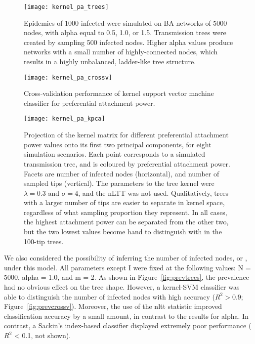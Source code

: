 \begin{figure}[ht]
  \centering
  \label{fig:patrees}
  \texttt{[image: kernel\_pa\_trees]}
  \caption[Visibly distinctive trees simulated under three values of \gls{alpha}]{
    Epidemics of 1000 infected were simulated on \gls{BA} networks of 5000
    nodes, with \gls{alpha} equal to 0.5, 1.0, or 1.5. Transmission trees were
    created by sampling 500 infected nodes. Higher \gls{alpha} values produce
    networks with a small number of highly-connected nodes, which results in a
    highly unbalanced, ladder-like tree structure.
  }
\end{figure}

\begin{figure}[ht]
  \centering
  \label{fig:pacrossv}
  \texttt{[image: kernel\_pa\_crossv]}
  \caption[Cross-validation performance of kernel support vector machine
  classifier for preferential attachment power]{
    Cross-validation performance of kernel support vector machine classifier
    for preferential attachment power.
  }
\end{figure}

\begin{figure}[ht]
  \centering
  \label{fig:pakpca}
  \texttt{[image: kernel\_pa\_kpca]}
  \caption[Projection of kernel matrix for different attachment power values
  onto its first two principal components]{
    Projection of the kernel matrix for different preferential attachment power
    values onto its first two principal components, for eight simulation
    scenarios. Each point corresponds to a simulated transmission tree, and is
    coloured by preferential attachment power. Facets are number of infected
    nodes (horizontal), and number of sampled tips (vertical). The parameters
    to the tree kernel were $\lambda = 0.3$ and $\sigma = 4$, and the nLTT was
    not used. Qualitatively, trees with a larger number of tips are easier to
    separate in kernel space, regardless of what sampling proportion they
    represent. In all cases, the highest attachment power can be separated from
    the other two, but the two lowest values become hand to distinguish with in
    the 100-tip trees.
  }
\end{figure}

We also considered the possibility of inferring the number of infected nodes,
or , under this model. All parameters except \gls{I} were
fixed at the following values: \gls{N} = 5000, \gls{alpha} = 1.0, and \gls{m} =
2. As shown in Figure~\ref{fig:prevtrees}, the prevalence had no obvious effect
on the tree shape. However, a kernel-\gls{SVM} classifier was able to
distinguish the number of infected nodes with high accuracy ($R^2 > 0.9$;
Figure~\ref{fig:prevcrossv}). Moreover, the use of the \gls{nltt} statistic
improved classification accuracy by a small amount, in contrast to the results
for \gls{alpha}. In contrast, a Sackin's index-based classifier displayed
extremely poor performance ($R^2$ < 0.1, not shown). 

